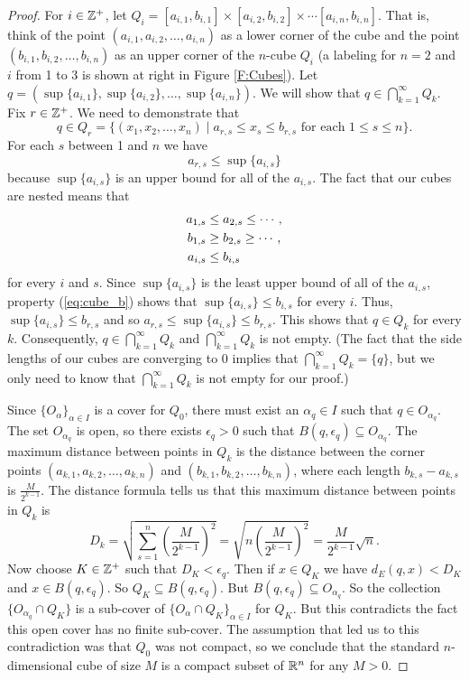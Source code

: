 \begin{proof}
For $i \in \mathbb{Z}^+$, let $Q_i = [a_{i,1}, b_{i,1}] \times [a_{i,2}, b_{i,2}] \times \cdots [a_{i,n}, b_{i,n}]$. That is, think of the point $(a_{i,1}, a_{i,2}, \ldots, a_{i,n})$ as a lower corner of the cube and the point $(b_{i,1}, b_{i,2}, \ldots, b_{i,n})$ as an upper corner of the $n$-cube $Q_i$ (a labeling for $n=2$ and $i$ from 1 to 3 is shown at right in Figure \ref{F:Cubes}).  Let $q = (\sup\{a_{i,1}\}, \sup\{a_{i,2}\}, \ldots, \sup\{a_{i,n}\})$. We will show that $q \in \bigcap_{k=1}^{\infty} Q_k$. Fix $r \in \mathbb{Z}^+$. We need to demonstrate that 
\[q \in Q_r = \{(x_1, x_2, \ldots, x_n) \mid a_{r,s} \leq x_s \leq b_{r,s} \text{ for each } 1 \leq s \leq n\}.\]
For each $s$ between 1 and $n$ we have 
\begin{equation} \label{eq:cube_a}
a_{r,s} \leq \sup\{a_{i,s}\}
\end{equation}
because $\sup\{a_{i,s}\}$ is an upper bound for all of the $a_{i,s}$.  The fact that our cubes are nested means that
\begin{align}
a_{1,s} &\leq a_{2,s} \leq \cdots, \notag \\
b_{1,s} &\geq b_{2,s} \geq \cdots, \notag \\
a_{i,s} &\leq b_{i,s} \label{eq:cube_b}
\end{align}
for every $i$ and $s$. Since $\sup\{a_{i,s}\}$ is the least upper bound of all of the $a_{i,s}$, property (\ref{eq:cube_b}) shows that $\sup\{a_{i,s}\} \leq b_{i,s}$ for every $i$. Thus, $\sup\{a_{i,s}\} \leq b_{r,s}$ and so $a_{r,s} \leq \sup\{a_{i,s}\} \leq b_{r,s}$. This shows that $q \in Q_k$ for every $k$. Consequently, $q \in \bigcap_{k=1}^{\infty} Q_k$ and $\bigcap_{k=1}^{\infty} Q_k$ is not empty. (The fact that the  side lengths of our cubes are converging to 0 implies that $\bigcap_{k=1}^{\infty} Q_k = \{q\}$, but we only need to know that $\bigcap_{k=1}^{\infty} Q_k$ is not empty for our proof.)

Since $\{O_{\alpha}\}_{\alpha \in I}$ is a cover for $Q_0$, there must exist an $\alpha_q \in I$ such that $q \in O_{\alpha_q}$. The set $O_{\alpha_q}$ is open, so there exists $\epsilon_q > 0$ such that $B(q, \epsilon_q) \subseteq O_{\alpha_q}$. The maximum distance between points in $Q_k$ is the distance between the corner points $(a_{k,1}, a_{k,2}, \ldots, a_{k,n})$ and $(b_{k,1}, b_{k,2}, \ldots, b_{k,n})$, where each length $b_{k,s} - a_{k,s}$ is $\frac{M}{2^{k-1}}$. The distance formula tells us that this maximum distance between points in $Q_k$ is 
\[D_k = \sqrt{ \sum_{s=1}^n \left(\frac{M}{2^{k-1}}\right)^2} =  \sqrt{ n \left(\frac{M}{2^{k-1}}\right)^2} = \frac{M}{2^{k-1}} \sqrt{n}.\]
Now choose $K \in \mathbb{Z}^+$ such that $D_K < \epsilon_q$.  Then if $x \in Q_K$ we have $d_E(q,x)< D_K$ and $x \in B(q, \epsilon_q)$. So $Q_K \subseteq B(q, \epsilon_q)$. But $B(q, \epsilon_q) \subseteq O_{\alpha_q}$. So the collection $\{O_{\alpha_q} \cap Q_K\}$ is a sub-cover of $\{O_{\alpha} \cap Q_K\}_{\alpha \in I}$ for $Q_K$. But this contradicts the fact this open cover has no finite sub-cover. The assumption that led us to this contradiction was that $Q_0$ was not compact, so we conclude that the standard $n$-dimensional cube of size $M$ is a compact subset of $\mathbb{R}^n$ for any $M > 0$.  
\end{proof} 



